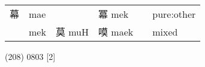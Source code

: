 \documentclass[14pt,a4paper]{scrartcl}
\begin{document}
\begin{longtable}[c]{@{}llllll@{}}
\begin{minipage}[t]{0.14\columnwidth}\raggedright\strut
幕
\strut\end{minipage} &
\begin{minipage}[t]{0.14\columnwidth}\raggedright\strut
mae
\strut\end{minipage} &
\begin{minipage}[t]{0.14\columnwidth}\raggedright\strut
\strut\end{minipage} &
\begin{minipage}[t]{0.14\columnwidth}\raggedright\strut
冪 mek
\strut\end{minipage} &
\begin{minipage}[t]{0.14\columnwidth}\raggedright\strut
\strut\end{minipage} &
\begin{minipage}[t]{0.14\columnwidth}\raggedright\strut
pure:other
\strut\end{minipage}\tabularnewline
\begin{minipage}[t]{0.14\columnwidth}\raggedright\strut
𦱤
\strut\end{minipage} &
\begin{minipage}[t]{0.14\columnwidth}\raggedright\strut
mek
\strut\end{minipage} &
\begin{minipage}[t]{0.14\columnwidth}\raggedright\strut
莫 muH
\strut\end{minipage} &
\begin{minipage}[t]{0.14\columnwidth}\raggedright\strut
嗼 maek
\strut\end{minipage} &
\begin{minipage}[t]{0.14\columnwidth}\raggedright\strut
\strut\end{minipage} &
\begin{minipage}[t]{0.14\columnwidth}\raggedright\strut
mixed
\strut\end{minipage}\tabularnewline
\bottomrule
\end{longtable}

(208) 0803 {[}2{]}
\end{document}
